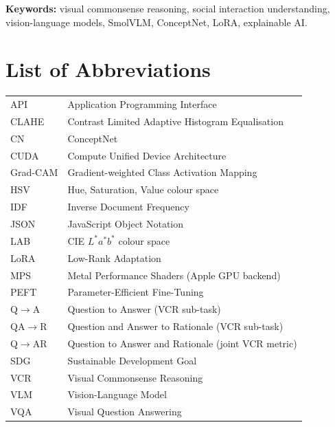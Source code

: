 \documentclass[12pt,a4paper,oneside]{report}
\newcommand{\QtoA}{Q$\rightarrow$A}
\newcommand{\QAtoR}{QA$\rightarrow$R}
\newcommand{\QtoAR}{Q$\rightarrow$AR}
\begin{document}
\vspace{0.5cm}
\noindent\textbf{Keywords:} visual commonsense reasoning, social interaction
understanding, vision-language models, SmolVLM, ConceptNet, LoRA,
explainable AI.

\tableofcontents
\listoffigures
\listoftables
\cleardoublepage
{}
{}
\listofalgorithms

\chapter*{List of Abbreviations}
\begin{tabular}{@{}p{3.2cm}p{10.5cm}@{}}
API      & Application Programming Interface\\
CLAHE    & Contrast Limited Adaptive Histogram Equalisation\\
CN       & ConceptNet\\
CUDA     & Compute Unified Device Architecture\\
Grad-CAM & Gradient-weighted Class Activation Mapping\\
HSV      & Hue, Saturation, Value colour space\\
IDF      & Inverse Document Frequency\\
JSON     & JavaScript Object Notation\\
LAB      & CIE $L^*a^*b^*$ colour space\\
LoRA     & Low-Rank Adaptation\\
MPS      & Metal Performance Shaders (Apple GPU backend)\\
PEFT     & Parameter-Efficient Fine-Tuning\\
\QtoA    & Question to Answer (VCR sub-task)\\
\QAtoR   & Question and Answer to Rationale (VCR sub-task)\\
\QtoAR   & Question to Answer and Rationale (joint VCR metric)\\
SDG      & Sustainable Development Goal\\
VCR      & Visual Commonsense Reasoning\\
VLM      & Vision-Language Model\\
VQA      & Visual Question Answering\\
\end{tabular}
\end{document}
